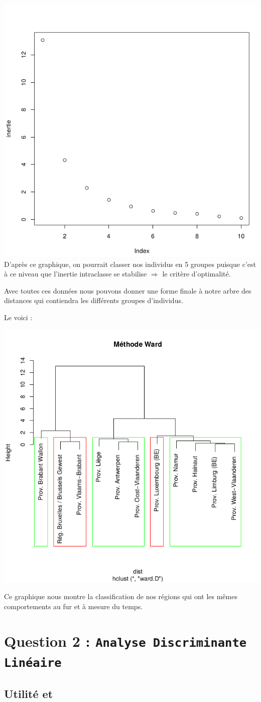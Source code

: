 \documentclass{article}
\begin{document}
\includegraphics[width=\textwidth]{Inertie}
\newpage
D'après ce graphique, on pourrait classer nos individus en 5 groupes puisque c'est à ce niveau que l'inertie intraclasse se stabilise $\Rightarrow$ le critère d'optimalité.

Avec toutes ces données nous pouvons donner une forme finale à notre arbre des distances qui contiendra les différents groupes d'individus.

Le voici : 

\includegraphics[width=\textwidth]{Ward}

Ce graphique nous montre la classification de nos régions qui ont les mêmes comportements au fur et à mesure du temps.

\section{Question 2 : \texttt{Analyse Discriminante Linéaire}}

\subsection{Utilité et }
\end{document}
